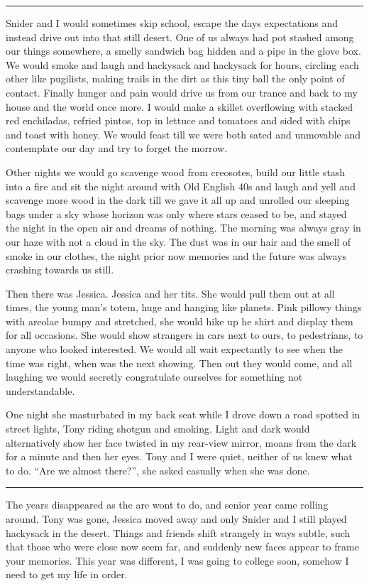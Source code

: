 \documentclass[ebook, 10pt, openright, onecolumn]{memoir}
\newcommand*\starbreak{\fancybreak*{\Large{* * *}}}
\begin{document}
\starbreak

Snider and I would sometimes skip school, escape the days expectations and
instead drive out into that still desert.  One of us always had pot stashed
among our things somewhere, a smelly sandwich bag hidden and a pipe in the glove
box. We would smoke and laugh and hackysack and hackysack for hours, circling
each other like pugilists, making trails in the dirt as this tiny ball the only
point of contact.  Finally hunger and pain would drive us from our trance and
back to my house and the world once more.  I would make a skillet overflowing
with stacked red enchiladas, refried pintos, top in lettuce and tomatoes and
sided with chips and toast with honey.  We would feast till we were both sated
and unmovable and contemplate our day and try to forget the morrow.

Other nights we would go scavenge wood from creosotes, build our little
stash into a fire and sit the night around with Old English 40s and laugh and
yell and scavenge more wood in the dark till we gave it all up and unrolled our
sleeping bags under a sky whose horizon was only where stars ceased to be, and
stayed the night in the open air and dreams of nothing.  The morning was always
gray in our haze with not a cloud in the sky.  The dust was in our hair and the
smell of smoke in our clothes, the night prior now memories and the future was
always crashing towards us still.

Then there was Jessica. Jessica and her tits.  She would pull them out at all
times, the young man's totem, huge and hanging like planets.  Pink pillowy
things with areolae bumpy and stretched, she would hike up he shirt and display
them for all occasions.  She would show strangers in cars next to ours, to
pedestrians, to anyone who looked interested.  We would all wait expectantly to
see when the time was right, when was the next showing. Then out they would
come, and all laughing we would secretly congratulate ourselves for something
not understandable.

One night she masturbated in my back seat while I drove down a road spotted in
street lights, Tony riding shotgun and smoking.  Light and dark would
alternatively show her face twisted in my rear-view mirror, moans from the dark
for a minute and then her eyes.  Tony and I were quiet, neither of us knew what
to do.  ``Are we almost there?'', she asked casually when she was done.

\starbreak

The years disappeared as the are wont to do, and senior year came rolling
around.  Tony was gone, Jessica moved away and only Snider and I still played
hackysack in the desert.  Things and friends shift strangely in ways subtle,
such that those who were close now seem far, and suddenly new faces appear to
frame your memories.  This year was different, I was going to college soon,
somehow I need to get my life in order.
\end{document}
